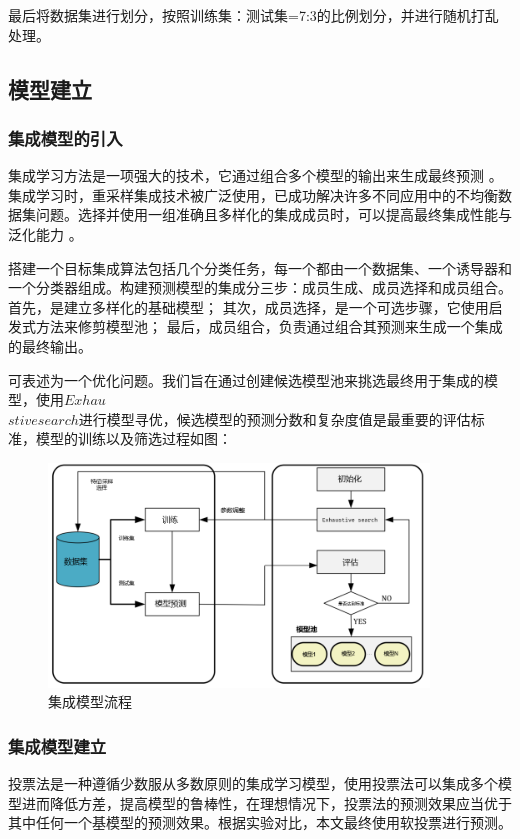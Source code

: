 \documentclass[UTF8]{ctexart}
\begin{document}
最后将数据集进行划分，按照训练集：测试集=7:3的比例划分，并进行随机打乱处理。

\subsection{模型建立}
\subsubsection{集成模型的引入}
集成学习方法是一项强大的技术，它通过组合多个模型的输出来生成最终预测 \cite{ref3} 。集成学习时，重采样集成技术被广泛使用，已成功解决许多不同应用中的不均衡数据集问题。选择并使用一组准确且多样化的集成成员时，可以提高最终集成性能与泛化能力\cite{ref4} 。

搭建一个目标集成算法包括几个分类任务，每一个都由一个数据集、一个诱导器和一个分类器组成。构建预测模型的集成分三步：成员生成、成员选择和成员组合。
首先，是建立多样化的基础模型；
其次，成员选择，是一个可选步骤，它使用启发式方法来修剪模型池；
最后，成员组合，负责通过组合其预测来生成一个集成的最终输出。


可表述为一个优化问题。我们旨在通过创建候选模型池来挑选最终用于集成的模型，使用$Exhau$ \\ $stive search$进行模型寻优，候选模型的预测分数和复杂度值是最重要的评估标准，模型的训练以及筛选过程如图：

\begin{figure}[H]\centering
    \includegraphics[width=0.9\textwidth]{img/集成模型流程.png} %
    \caption{集成模型流程} %
    \label{fig:figure 8} %
\end{figure}

\subsubsection{集成模型建立}
投票法是一种遵循少数服从多数原则的集成学习模型，使用投票法可以集成多个模型进而降低方差，提高模型的鲁棒性，在理想情况下，投票法的预测效果应当优于其中任何一个基模型的预测效果。根据实验对比，本文最终使用软投票进行预测。
\end{document}
